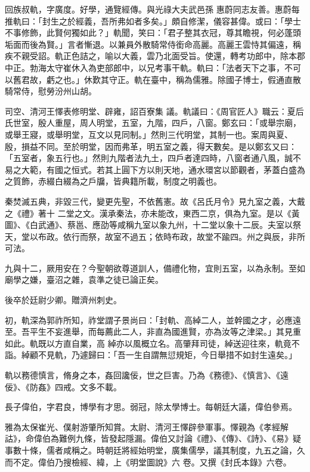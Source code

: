 \begin{pinyinscope}
 回族叔軌，字廣度。好學，通覽經傳。與光祿大夫武邑孫
 惠蔚同志友善。惠蔚每推軌曰：「封生之於經義，吾所弗如者多矣。」頗自修潔，儀容甚偉。或曰：「學士不事修飾，此賢何獨如此？」軌聞，笑曰：「君子整其衣冠，尊其瞻視，何必蓬頭垢面而後為賢。」言者慚退。以兼員外散騎常侍銜命高麗。高麗王雲恃其偏遠，稱疾不親受詔。軌正色詰之，喻以大義，雲乃北面受旨。使還，轉考功郎中，除本郡中正。勃海太守崔休入為吏部郎中，以兄考事干軌。軌曰：「法者天下之事，不可以舊君故，虧之也。」休歎其守正。軌在臺中，稱為儒雅。除國子博士，假通直散騎常侍，慰勞汾州山胡。



 司空、清河王懌表修明堂、辟雍，詔百寮集
 議。軌議曰：《周官匠人》職云：夏后氏世室，殷人重屋，周人明堂，五室，九階，四戶，八窗。鄭玄曰：「或舉宗廟，或舉王寢，或舉明堂，互文以見同制。」然則三代明堂，其制一也。案周與夏、殷，損益不同。至於明堂，因而弗革，明五室之義，得天數矣。是以鄭玄又曰：「五室者，象五行也。」然則九階者法九土，四戶者達四時，八窗者通八風，誠不易之大範，有國之恒式。若其上圓下方以則天地，通水環宮以節觀者，茅蓋白盛為之質飾，赤綴白綴為之戶牖，皆典籍所載，制度之明義也。



 秦焚滅五典，非毀三代，變更先聖，不依舊憲。故《呂氏月令》見九室之義，大戴之《禮》著十
 二堂之文。漢承秦法，亦未能改，東西二京，俱為九室。是以《黃圖》、《白武通》、蔡邕、應劭等咸稱九室以象九州，十二堂以象十二辰。夫室以祭天，堂以布政。依行而祭，故室不過五；依時布政，故堂不踰四。州之與辰，非所可法。



 九與十二，厥用安在？今聖朝欲尊道訓人，備禮化物，宜則五室，以為永制。至如廟學之嫌，臺沼之雜，袁準之徒已論正矣。



 後卒於廷尉少卿。贈濟州刺史。



 初，軌深為郭祚所知，祚堂謂子景尚曰：「封軌、高綽二人，並幹國之才，必應遠至。吾平生不妄進舉，而每薦此二人，非直為國進賢，亦為汝等之津梁。」其見重如此。軌既以方直自業，高
 綽亦以風概立名。高肇拜司徒，綽送迎往來，軌竟不詣。綽顧不見軌，乃遽歸曰：「吾一生自謂無愆規矩，今日舉措不如封生遠矣。」



 軌以務德慎言，脩身之本，姦回讒佞，世之巨害。乃為《務德》、《慎言》、《遠佞》、《防姦》四戒。文多不載。



 長子偉伯，字君良，博學有才思。弱冠，除太學博士。每朝廷大議，偉伯參焉。



 雅為太保崔光、僕射游肇所知賞。太尉、清河王懌辟參軍事。懌親為《孝經解詁》，命偉伯為難例九條，皆發起隱漏。偉伯又討論《禮》、《傳》、《詩》、《易》疑事數十條，儒者咸稱之。時朝廷將經始明堂，廣集儒學，議其制度，九五之論，久而不定。偉伯乃搜檢經、緯，上《明堂圖說》六
 卷。又撰《封氏本錄》六卷。




\end{pinyinscope}
